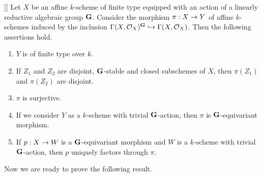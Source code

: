 \begin{theorem}\label{theorem:affine_good_quotients_for_linearly_reductive_groups}[{\cite[Theorem 5.4 and discussion below its statement]{bialynicki2013algebraic}}]
Let $X$ be an affine $k$-scheme of finite type equipped with an action of a linearly reductive algebraic group $\mathbf{G}$. Consider the morphism $\pi:X\rightarrow Y$ of affine $k$-schemes induced by the inclusion $\Gamma(X,{\mathcal O}_X)^{\mathbf{G}}\hookrightarrow \Gamma(X,{\mathcal O}_X)$. Then the following assertions hold.
\begin{enumerate}[label=\emph{\textbf{(\arabic*)}}, leftmargin=3.0em]
\item $Y$ is of finite type over $k$.
\item If $Z_1$ and $Z_2$ are disjoint, $\mathbf{G}$-stable and closed subschemes of $X$, then $\pi(Z_1)$ and $\pi(Z_2)$ are disjoint.
\item $\pi$ is surjective.
\item If we consider $Y$ as a $k$-scheme with trivial $\mathbf{G}$-action, then $\pi$ is $\mathbf{G}$-equivariant morphism.
\item If $p:X\rightarrow W$ is a $\mathbf{G}$-equivariant morphism and $W$ is a $k$-scheme with trivial $\mathbf{G}$-action, then $p$ uniquely factors through $\pi$.
\end{enumerate}
\end{theorem}
\noindent
Now we are ready to prove the following result.

